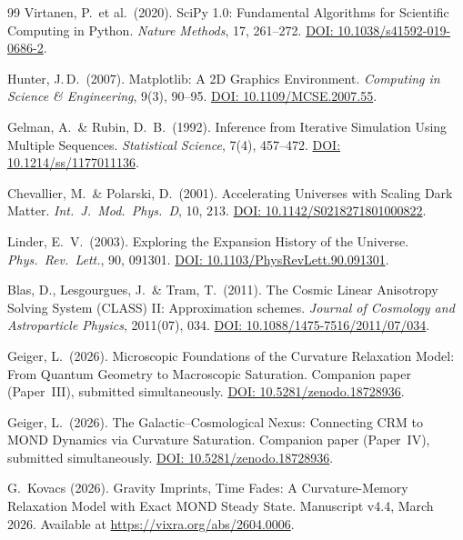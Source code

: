 \documentclass[aps,prd,twocolumn,superscriptaddress,nofootinbib]{revtex4-2}
\begin{document}
\begin{thebibliography}{99}
Virtanen, P.\ et al.\ (2020).
SciPy 1.0: Fundamental Algorithms for Scientific Computing in Python.
\textit{Nature Methods}, 17, 261--272.
\href{https://doi.org/10.1038/s41592-019-0686-2}{DOI: 10.1038/s41592-019-0686-2}.

Hunter, J.\,D.\ (2007).
Matplotlib: A 2D Graphics Environment.
\textit{Computing in Science \& Engineering}, 9(3), 90--95.
\href{https://doi.org/10.1109/MCSE.2007.55}{DOI: 10.1109/MCSE.2007.55}.

Gelman, A.\ \& Rubin, D.~B.\ (1992).
Inference from Iterative Simulation Using Multiple Sequences.
\textit{Statistical Science}, 7(4), 457--472.
\href{https://doi.org/10.1214/ss/1177011136}{DOI: 10.1214/ss/1177011136}.

Chevallier, M.\ \& Polarski, D.\ (2001).
Accelerating Universes with Scaling Dark Matter.
\textit{Int.\ J.\ Mod.\ Phys.\ D}, 10, 213.
\href{https://doi.org/10.1142/S0218271801000822}{DOI: 10.1142/S0218271801000822}.

Linder, E.~V.\ (2003).
Exploring the Expansion History of the Universe.
\textit{Phys.\ Rev.\ Lett.}, 90, 091301.
\href{https://doi.org/10.1103/PhysRevLett.90.091301}{DOI: 10.1103/PhysRevLett.90.091301}.

Blas, D., Lesgourgues, J.\ \& Tram, T.\ (2011).
The Cosmic Linear Anisotropy Solving System (CLASS) II: Approximation schemes.
\textit{Journal of Cosmology and Astroparticle Physics}, 2011(07), 034.
\href{https://doi.org/10.1088/1475-7516/2011/07/034}{DOI: 10.1088/1475-7516/2011/07/034}.

Geiger, L.\ (2026).
Microscopic Foundations of the Curvature Relaxation Model: From Quantum Geometry to Macroscopic Saturation.
Companion paper (Paper~III), submitted simultaneously.
\href{https://doi.org/10.5281/zenodo.18728936}{DOI: 10.5281/zenodo.18728936}.

Geiger, L.\ (2026).
The Galactic--Cosmological Nexus: Connecting CRM to MOND Dynamics via Curvature Saturation.
Companion paper (Paper~IV), submitted simultaneously.
\href{https://doi.org/10.5281/zenodo.18728936}{DOI: 10.5281/zenodo.18728936}.

G.~Kovacs (2026).
Gravity Imprints, Time Fades: A Curvature-Memory Relaxation Model with Exact MOND Steady State.
Manuscript v4.4, March 2026.
Available at \url{https://vixra.org/abs/2604.0006}.

\end{thebibliography}
\end{document}
